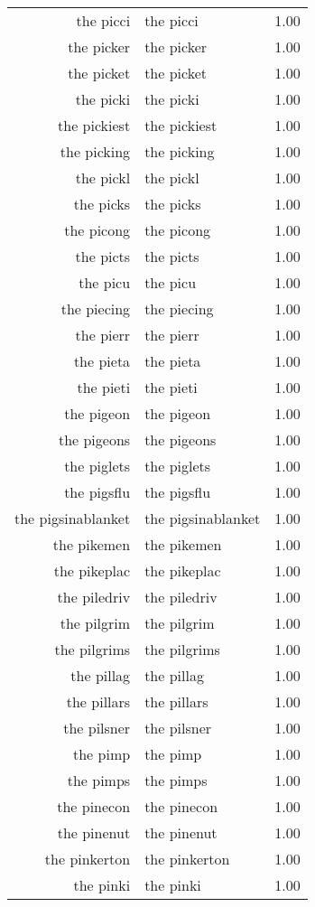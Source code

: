 \begin{table}[ht]
\begin{tabular}{rlr}
  the picci & the picci & 1.00 \\ 
  the picker & the picker & 1.00 \\ 
  the picket & the picket & 1.00 \\ 
  the picki & the picki & 1.00 \\ 
  the pickiest & the pickiest & 1.00 \\ 
  the picking & the picking & 1.00 \\ 
  the pickl & the pickl & 1.00 \\ 
  the picks & the picks & 1.00 \\ 
  the picong & the picong & 1.00 \\ 
  the picts & the picts & 1.00 \\ 
  the picu & the picu & 1.00 \\ 
  the piecing & the piecing & 1.00 \\ 
  the pierr & the pierr & 1.00 \\ 
  the pieta & the pieta & 1.00 \\ 
  the pieti & the pieti & 1.00 \\ 
  the pigeon & the pigeon & 1.00 \\ 
  the pigeons & the pigeons & 1.00 \\ 
  the piglets & the piglets & 1.00 \\ 
  the pigsflu & the pigsflu & 1.00 \\ 
  the pigsinablanket & the pigsinablanket & 1.00 \\ 
  the pikemen & the pikemen & 1.00 \\ 
  the pikeplac & the pikeplac & 1.00 \\ 
  the piledriv & the piledriv & 1.00 \\ 
  the pilgrim & the pilgrim & 1.00 \\ 
  the pilgrims & the pilgrims & 1.00 \\ 
  the pillag & the pillag & 1.00 \\ 
  the pillars & the pillars & 1.00 \\ 
  the pilsner & the pilsner & 1.00 \\ 
  the pimp & the pimp & 1.00 \\ 
  the pimps & the pimps & 1.00 \\ 
  the pinecon & the pinecon & 1.00 \\ 
  the pinenut & the pinenut & 1.00 \\ 
  the pinkerton & the pinkerton & 1.00 \\ 
  the pinki & the pinki & 1.00 \\ 

\end{tabular}
\end{table}
